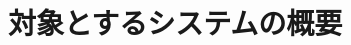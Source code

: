 \documentclass[../main]{subfiles}
\begin{document}
\graphicspath{{../figures/chap1/}}

\section{対象とするシステムの概要}
\label{sec:intro_target-system}
\end{document}
